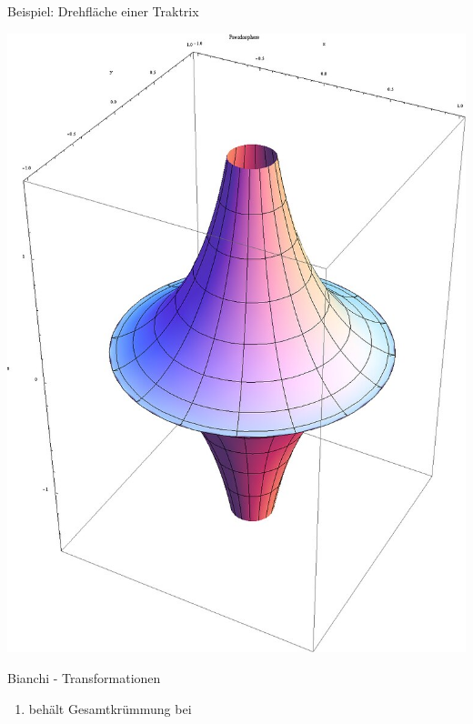 \documentclass[12pt]{beamer}
\begin{document}
\begin{frame}{Beispiel: Drehfläche einer Traktrix}
\begin{center}
\includegraphics[scale=0.2]{pseudosphere.png}
\end{center}
\end{frame}


\begin{frame}{Bianchi - Transformationen}
\begin{enumerate}
\item behält Gesamtkrümmung bei

\end{enumerate}
\end{frame}
\end{document}
